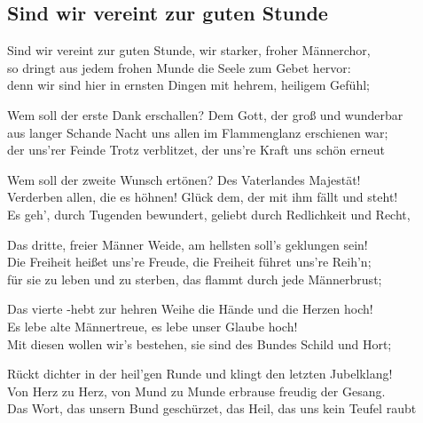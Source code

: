 
\subsection*{Sind wir vereint zur guten Stunde}
%

\thestrophe Sind wir vereint zur guten Stunde, wir starker, froher Männerchor, \\
so dringt aus jedem frohen Munde die Seele zum Gebet hervor: \\
denn wir sind hier in ernsten Dingen mit hehrem, heiligem Gefühl; \\

\thestrophe Wem soll der erste Dank erschallen? Dem Gott, der groß und wunderbar \\
aus langer Schande Nacht uns allen im Flammenglanz erschienen war; \\
der uns'rer Feinde Trotz verblitzet, der uns're Kraft uns schön erneut \\

\thestrophe Wem soll der zweite Wunsch ertönen? Des Vaterlandes Majestät! \\
Verderben allen, die es höhnen! Glück dem, der mit ihm fällt und steht! \\
Es geh', durch Tugenden bewundert, geliebt durch Redlichkeit und Recht, \\

\thestrophe Das dritte, freier Männer Weide, am hellsten soll's geklungen sein! \\
Die Freiheit heißet uns're Freude, die Freiheit führet uns're Reih'n; \\
für sie zu leben und zu sterben, das flammt durch jede Männerbrust; \\

\thestrophe Das vierte -hebt zur hehren Weihe die Hände und die Herzen hoch! \\
Es lebe alte Männertreue, es lebe unser Glaube hoch! \\
Mit diesen wollen wir's bestehen, sie sind des Bundes Schild und Hort; \\

\thestrophe Rückt dichter in der heil'gen Runde und klingt den letzten Jubelklang! \\
Von Herz zu Herz, von Mund zu Munde erbrause freudig der Gesang. \\
Das Wort, das unsern Bund geschürzet, das Heil, das uns kein Teufel raubt \\

